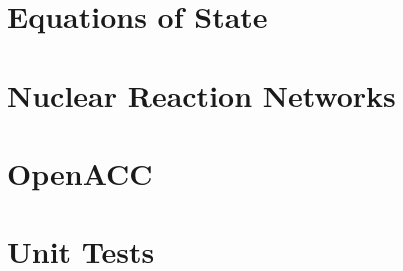 \documentclass[11pt]{book}
\begin{document}



\chapter{Equations of State}
\label{chapter:eos}




\chapter{Nuclear Reaction Networks}
\label{chapter:networks}




\chapter{OpenACC}
\label{chapter:openacc}




\chapter{Unit Tests}




\backmatter

\renewcommand\bibname{References}


\end{document}
